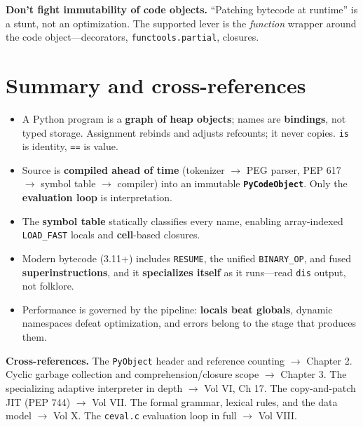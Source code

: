 \textbf{Don't fight immutability of code objects.} ``Patching bytecode at runtime'' is a
stunt, not an optimization. The supported lever is the \emph{function} wrapper around the
code object---decorators, \texttt{functools.partial}, closures.

\section{Summary and cross-references}

\begin{itemize}
  \item A Python program is a \textbf{graph of heap objects}; names are \textbf{bindings},
    not typed storage. Assignment rebinds and adjusts refcounts; it never copies.
    \texttt{is} is identity, \texttt{==} is value.
  \item Source is \textbf{compiled ahead of time} (tokenizer $\rightarrow$ PEG parser,
    PEP 617 $\rightarrow$ symbol table $\rightarrow$ compiler) into an immutable
    \textbf{\texttt{PyCodeObject}}. Only the \textbf{evaluation loop} is interpretation.
  \item The \textbf{symbol table} statically classifies every name, enabling array-indexed
    \texttt{LOAD\_FAST} locals and \textbf{cell}-based closures.
  \item Modern bytecode (3.11+) includes \texttt{RESUME}, the unified \texttt{BINARY\_OP},
    and fused \textbf{superinstructions}, and it \textbf{specializes itself} as it
    runs---read \texttt{dis} output, not folklore.
  \item Performance is governed by the pipeline: \textbf{locals beat globals}, dynamic
    namespaces defeat optimization, and errors belong to the stage that produces them.
\end{itemize}

\textbf{Cross-references.} The \texttt{PyObject} header and reference counting $\rightarrow$
Chapter 2. Cyclic garbage collection and comprehension/closure scope $\rightarrow$
Chapter 3. The specializing adaptive interpreter in depth $\rightarrow$ Vol VI, Ch 17. The
copy-and-patch JIT (PEP 744) $\rightarrow$ Vol VII. The formal grammar, lexical rules, and
the data model $\rightarrow$ Vol X. The \texttt{ceval.c} evaluation loop in full $\rightarrow$
Vol VIII.
